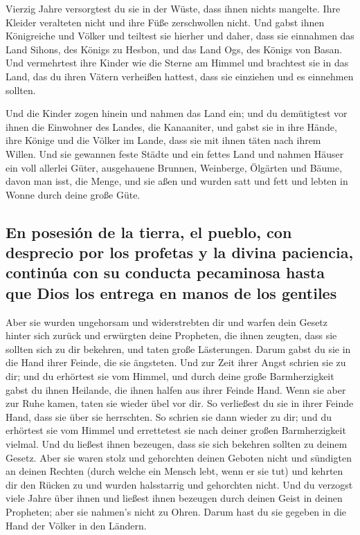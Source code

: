  Vierzig Jahre versorgtest du sie in der Wüste, dass
ihnen nichts mangelte. Ihre Kleider veralteten nicht und ihre Füße
zerschwollen nicht.  Und gabst ihnen Königreiche und
Völker und teiltest sie hierher und daher, dass sie einnahmen das Land
Sihons, des Königs zu Hesbon, und das Land Ogs, des Königs von Basan.
 Und vermehrtest ihre Kinder wie die Sterne am Himmel und
brachtest sie in das Land, das du ihren Vätern verheißen hattest, dass
sie einziehen und es einnehmen sollten.

 Und die Kinder zogen hinein und nahmen das Land ein; und
du demütigtest vor ihnen die Einwohner des Landes, die Kanaaniter, und
gabst sie in ihre Hände, ihre Könige und die Völker im Lande, dass sie
mit ihnen täten nach ihrem Willen.  Und sie gewannen
feste Städte und ein fettes Land und nahmen Häuser ein voll allerlei
Güter, ausgehauene Brunnen, Weinberge, Ölgärten und Bäume, davon man
isst, die Menge, und sie aßen und wurden satt und fett und lebten in
Wonne durch deine große Güte.

\hypertarget{en-posesiuxf3n-de-la-tierra-el-pueblo-con-desprecio-por-los-profetas-y-la-divina-paciencia-continuxfaa-con-su-conducta-pecaminosa-hasta-que-dios-los-entrega-en-manos-de-los-gentiles}{%
\subsection{En posesión de la tierra, el pueblo, con desprecio por los
profetas y la divina paciencia, continúa con su conducta pecaminosa
hasta que Dios los entrega en manos de los
gentiles}\label{en-posesiuxf3n-de-la-tierra-el-pueblo-con-desprecio-por-los-profetas-y-la-divina-paciencia-continuxfaa-con-su-conducta-pecaminosa-hasta-que-dios-los-entrega-en-manos-de-los-gentiles}}

 Aber sie wurden ungehorsam und widerstrebten dir und
warfen dein Gesetz hinter sich zurück und erwürgten deine Propheten, die
ihnen zeugten, dass sie sollten sich zu dir bekehren, und taten große
Lästerungen.  Darum gabst du sie in die Hand ihrer
Feinde, die sie ängsteten. Und zur Zeit ihrer Angst schrien sie zu dir;
und du erhörtest sie vom Himmel, und durch deine große Barmherzigkeit
gabst du ihnen Heilande, die ihnen halfen aus ihrer Feinde Hand.
 Wenn sie aber zur Ruhe kamen, taten sie wieder übel vor
dir. So verließest du sie in ihrer Feinde Hand, dass sie über sie
herrschten. So schrien sie dann wieder zu dir; und du erhörtest sie vom
Himmel und errettetest sie nach deiner großen Barmherzigkeit vielmal.
 Und du ließest ihnen bezeugen, dass sie sich bekehren
sollten zu deinem Gesetz. Aber sie waren stolz und gehorchten deinen
Geboten nicht und sündigten an deinen Rechten (durch welche ein Mensch
lebt, wenn er sie tut) und kehrten dir den Rücken zu und wurden
halsstarrig und gehorchten nicht.  Und du verzogst viele
Jahre über ihnen und ließest ihnen bezeugen durch deinen Geist in deinen
Propheten; aber sie nahmen's nicht zu Ohren. Darum hast du sie gegeben
in die Hand der Völker in den Ländern.

